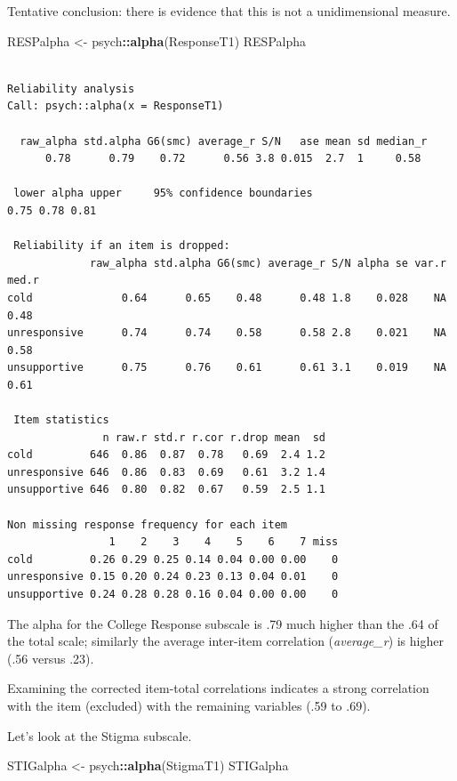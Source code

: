 \documentclass[
  english,
]{book}
\newenvironment{Shaded}{\begin{snugshade}}{\end{snugshade}}
\newcommand{\KeywordTok}[1]{\textcolor[rgb]{0.13,0.29,0.53}{\textbf{#1}}}
\newcommand{\NormalTok}[1]{#1}
\newcommand{\OperatorTok}[1]{\textcolor[rgb]{0.81,0.36,0.00}{\textbf{#1}}}
\newcommand{\StringTok}[1]{\textcolor[rgb]{0.31,0.60,0.02}{#1}}
\begin{document}
Tentative conclusion: there is evidence that this is not a unidimensional measure.

\begin{Shaded}
\begin{Highlighting}[]
\NormalTok{RESPalpha <-}\StringTok{ }\NormalTok{psych}\OperatorTok{::}\KeywordTok{alpha}\NormalTok{(ResponseT1)}
\NormalTok{RESPalpha}
\end{Highlighting}
\end{Shaded}

\begin{verbatim}

Reliability analysis   
Call: psych::alpha(x = ResponseT1)

  raw_alpha std.alpha G6(smc) average_r S/N   ase mean sd median_r
      0.78      0.79    0.72      0.56 3.8 0.015  2.7  1     0.58

 lower alpha upper     95% confidence boundaries
0.75 0.78 0.81 

 Reliability if an item is dropped:
             raw_alpha std.alpha G6(smc) average_r S/N alpha se var.r med.r
cold              0.64      0.65    0.48      0.48 1.8    0.028    NA  0.48
unresponsive      0.74      0.74    0.58      0.58 2.8    0.021    NA  0.58
unsupportive      0.75      0.76    0.61      0.61 3.1    0.019    NA  0.61

 Item statistics 
               n raw.r std.r r.cor r.drop mean  sd
cold         646  0.86  0.87  0.78   0.69  2.4 1.2
unresponsive 646  0.86  0.83  0.69   0.61  3.2 1.4
unsupportive 646  0.80  0.82  0.67   0.59  2.5 1.1

Non missing response frequency for each item
                1    2    3    4    5    6    7 miss
cold         0.26 0.29 0.25 0.14 0.04 0.00 0.00    0
unresponsive 0.15 0.20 0.24 0.23 0.13 0.04 0.01    0
unsupportive 0.24 0.28 0.28 0.16 0.04 0.00 0.00    0
\end{verbatim}

The alpha for the College Response subscale is .79 much higher than the .64 of the total scale; similarly the average inter-item correlation (\emph{average\_r}) is higher (.56 versus .23).

Examining the corrected item-total correlations indicates a strong correlation with the item (excluded) with the remaining variables (.59 to .69).

Let's look at the Stigma subscale.

\begin{Shaded}
\begin{Highlighting}[]
\NormalTok{STIGalpha <-}\StringTok{ }\NormalTok{psych}\OperatorTok{::}\KeywordTok{alpha}\NormalTok{(StigmaT1)}
\NormalTok{STIGalpha}
\end{Highlighting}
\end{Shaded}
\end{document}
